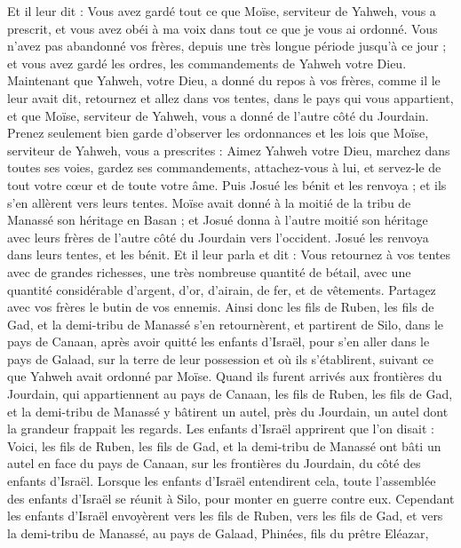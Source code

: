\begin{multicols}{2}
Et il leur dit : Vous avez gardé tout ce que Moïse, serviteur de Yahweh, vous a prescrit, et vous avez obéi à ma voix dans tout ce que je vous ai ordonné.
Vous n'avez pas abandonné vos frères, depuis une très longue période jusqu'à ce jour ; et vous avez gardé les ordres, les commandements de Yahweh votre Dieu.
Maintenant que Yahweh, votre Dieu, a donné du repos à vos frères, comme il le leur avait dit, retournez et allez dans vos tentes, dans le pays qui vous appartient, et que Moïse, serviteur de Yahweh, vous a donné de l'autre côté du Jourdain.
Prenez seulement bien garde d'observer les ordonnances et les lois que Moïse, serviteur de Yahweh, vous a prescrites : Aimez Yahweh votre Dieu, marchez dans toutes ses voies, gardez ses commandements, attachez-vous à lui, et servez-le de tout votre cœur et de toute votre âme.
Puis Josué les bénit et les renvoya ; et ils s'en allèrent vers leurs tentes.
Moïse avait donné à la moitié de la tribu de Manassé son héritage en Basan ; et Josué donna à l'autre moitié son héritage avec leurs frères de l'autre côté du Jourdain vers l'occident. Josué les renvoya dans leurs tentes, et les bénit.
Et il leur parla et dit : Vous retournez à vos tentes avec de grandes richesses, une très nombreuse quantité de bétail, avec une quantité considérable d'argent, d'or, d'airain, de fer, et de vêtements. Partagez avec vos frères le butin de vos ennemis.
Ainsi donc les fils de Ruben, les fils de Gad, et la demi-tribu de Manassé s'en retournèrent, et partirent de Silo, dans le pays de Canaan, après avoir quitté les enfants d'Israël, pour s'en aller dans le pays de Galaad, sur la terre de leur possession et où ils s'établirent, suivant ce que Yahweh avait ordonné par Moïse.
Quand ils furent arrivés aux frontières du Jourdain, qui appartiennent au pays de Canaan, les fils de Ruben, les fils de Gad, et la demi-tribu de Manassé y bâtirent un autel, près du Jourdain, un autel dont la grandeur frappait les regards.
Les enfants d'Israël apprirent que l'on disait : Voici, les fils de Ruben, les fils de Gad, et la demi-tribu de Manassé ont bâti un autel en face du pays de Canaan, sur les frontières du Jourdain, du côté des enfants d'Israël.
Lorsque les enfants d'Israël entendirent cela, toute l'assemblée des enfants d'Israël se réunit à Silo, pour monter en guerre contre eux.
Cependant les enfants d'Israël envoyèrent vers les fils de Ruben, vers les fils de Gad, et vers la demi-tribu de Manassé, au pays de Galaad, Phinées, fils du prêtre Eléazar,

\end{multicols}
